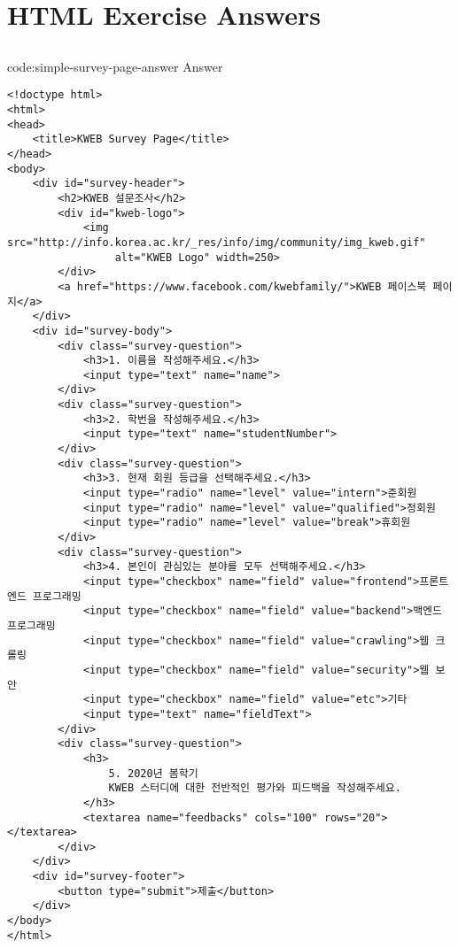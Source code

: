 \section{HTML Exercise Answers} \label{sect:html-exercise-answers}

\subsection*{}

\begin{codeenv}{code:simple-survey-page-answer}{ Answer}\begin{verbatim}
<!doctype html>
<html>
<head>
    <title>KWEB Survey Page</title>
</head>
<body>
    <div id="survey-header">
        <h2>KWEB 설문조사</h2>
        <div id="kweb-logo">
            <img src="http://info.korea.ac.kr/_res/info/img/community/img_kweb.gif"
                 alt="KWEB Logo" width=250>
        </div>
        <a href="https://www.facebook.com/kwebfamily/">KWEB 페이스북 페이지</a>
    </div>
    <div id="survey-body">
        <div class="survey-question">
            <h3>1. 이름을 작성해주세요.</h3>
            <input type="text" name="name">
        </div>
        <div class="survey-question">
            <h3>2. 학번을 작성해주세요.</h3>
            <input type="text" name="studentNumber">
        </div>
        <div class="survey-question">
            <h3>3. 현재 회원 등급을 선택해주세요.</h3>
            <input type="radio" name="level" value="intern">준회원
            <input type="radio" name="level" value="qualified">정회원
            <input type="radio" name="level" value="break">휴회원
        </div>
        <div class="survey-question">
            <h3>4. 본인이 관심있는 분야를 모두 선택해주세요.</h3>
            <input type="checkbox" name="field" value="frontend">프론트엔드 프로그래밍
            <input type="checkbox" name="field" value="backend">백엔드 프로그래밍
            <input type="checkbox" name="field" value="crawling">웹 크롤링
            <input type="checkbox" name="field" value="security">웹 보안
            <input type="checkbox" name="field" value="etc">기타
            <input type="text" name="fieldText">
        </div>
        <div class="survey-question">
            <h3>
                5. 2020년 봄학기
                KWEB 스터디에 대한 전반적인 평가와 피드백을 작성해주세요.
            </h3>
            <textarea name="feedbacks" cols="100" rows="20"></textarea>
        </div>
    </div>
    <div id="survey-footer">
        <button type="submit">제출</button>
    </div>
</body>
</html>
\end{verbatim}
\end{codeenv}
